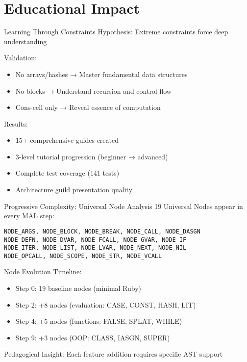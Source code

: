 \documentclass[presentation,aspectratio=169]{beamer}
\begin{document}
\section{Educational Impact}
\label{sec:org41a8412}

\begin{frame}[label={sec:org4a614bf}]{Learning Through Constraints}
\alert{Hypothesis}: Extreme constraints force deep understanding

\alert{Validation}:
\begin{itemize}
\item No arrays/hashes → Master fundamental data structures
\item No blocks → Understand recursion and control flow
\item Cons-cell only → Reveal essence of computation
\end{itemize}

\pause

\alert{Results}:
\begin{itemize}
\item 15+ comprehensive guides created
\item 3-level tutorial progression (beginner → advanced)
\item Complete test coverage (141 tests)
\item Architecture guild presentation quality
\end{itemize}
\end{frame}
\begin{frame}[label={sec:org64cf0b3},fragile]{Progressive Complexity: Universal Node Analysis}
 \alert{19 Universal Nodes} appear in every MAL step:
\begin{verbatim}
NODE_ARGS, NODE_BLOCK, NODE_BREAK, NODE_CALL, NODE_DASGN
NODE_DEFN, NODE_DVAR, NODE_FCALL, NODE_GVAR, NODE_IF
NODE_ITER, NODE_LIST, NODE_LVAR, NODE_NEXT, NODE_NIL
NODE_OPCALL, NODE_SCOPE, NODE_STR, NODE_VCALL
\end{verbatim}

\pause

\alert{Node Evolution Timeline}:
\begin{itemize}
\item Step 0: 19 baseline nodes (minimal Ruby)
\item Step 2: +8 nodes (evaluation: CASE, CONST, HASH, LIT)
\item Step 4: +5 nodes (functions: FALSE, SPLAT, WHILE)
\item Step 9: +3 nodes (OOP: CLASS, IASGN, SUPER)
\end{itemize}

\alert{Pedagogical Insight}: Each feature addition requires specific AST support
\end{frame}
\end{document}
